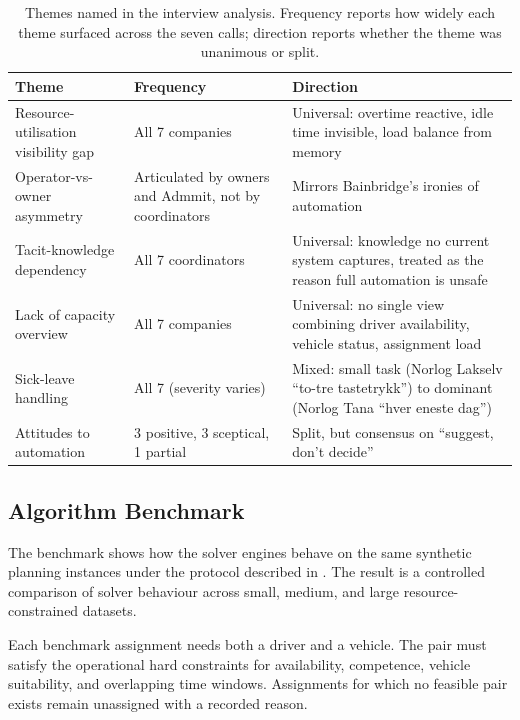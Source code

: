 \begin{table}[h]
\centering
\caption{Themes named in the interview analysis. Frequency reports how widely each theme surfaced across the seven calls; direction reports whether the theme was unanimous or split.}
\label{tab:themes}
\small
\begin{tabular}{p{}p{}p{}}
\toprule
\textbf{Theme} & \textbf{Frequency} & \textbf{Direction} \\
\midrule
Resource-utilisation visibility gap & All 7 companies & Universal: overtime reactive, idle time invisible, load balance from memory \\
Operator-vs-owner asymmetry & Articulated by owners and Admmit, not by coordinators & Mirrors Bainbridge's ironies of automation \\
Tacit-knowledge dependency & All 7 coordinators & Universal: knowledge no current system captures, treated as the reason full automation is unsafe \\
Lack of capacity overview & All 7 companies & Universal: no single view combining driver availability, vehicle status, assignment load \\
Sick-leave handling & All 7 (severity varies) & Mixed: small task (Norlog Lakselv ``to-tre tastetrykk'') to dominant (Norlog Tana ``hver eneste dag'') \\
Attitudes to automation & 3 positive, 3 sceptical, 1 partial & Split, but consensus on ``suggest, don't decide'' \\
\bottomrule
\end{tabular}
\end{table}

\subsection{Algorithm Benchmark}
\label{sec:algorithm}
\label{sec:algorithm-benchmark}

The benchmark shows how the solver engines behave on the same synthetic planning instances under the protocol described in . The result is a controlled comparison of solver behaviour across small, medium, and large resource-constrained datasets.

Each benchmark assignment needs both a driver and a vehicle. The pair must satisfy the operational hard constraints for availability, competence, vehicle suitability, and overlapping time windows. Assignments for which no feasible pair exists remain unassigned with a recorded reason.

